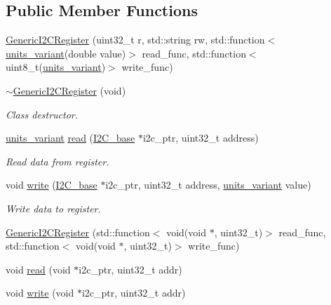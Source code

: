 \subsection*{Public Member Functions}
\begin{DoxyCompactItemize}
\item 
\hyperlink{class_generic_i2_c_register_acc3dd8df2df5532b2e30ba20c1ac8735}{Generic\+I2\+C\+Register} (uint32\+\_\+t r, std\+::string rw, std\+::function$<$ \hyperlink{units__define_8hpp_a95d46867fa79633565c288a0b4bd5408}{units\+\_\+variant}(double value)$>$ read\+\_\+func, std\+::function$<$ uint8\+\_\+t(\hyperlink{units__define_8hpp_a95d46867fa79633565c288a0b4bd5408}{units\+\_\+variant})$>$ write\+\_\+func)
\item 
\hyperlink{class_generic_i2_c_register_a17eb3844eb23aabe6fddfcef798e692f}{$\sim$\+Generic\+I2\+C\+Register} (void)
\begin{DoxyCompactList}\small\item\em Class destructor. \end{DoxyCompactList}\item 
\hyperlink{units__define_8hpp_a95d46867fa79633565c288a0b4bd5408}{units\+\_\+variant} \hyperlink{class_generic_i2_c_register_a86c28b9c5eecacca106132e7718b2646}{read} (\hyperlink{class_i2_c__base}{I2\+C\+\_\+base} $\ast$i2c\+\_\+ptr, uint32\+\_\+t address)
\begin{DoxyCompactList}\small\item\em Read data from register. \end{DoxyCompactList}\item 
void \hyperlink{class_generic_i2_c_register_ad6f38b7b54c95e3f8502de01f6122d60}{write} (\hyperlink{class_i2_c__base}{I2\+C\+\_\+base} $\ast$i2c\+\_\+ptr, uint32\+\_\+t address, \hyperlink{units__define_8hpp_a95d46867fa79633565c288a0b4bd5408}{units\+\_\+variant} value)
\begin{DoxyCompactList}\small\item\em Write data to register. \end{DoxyCompactList}\item 
\hyperlink{class_generic_i2_c_register_a20946c87287dd4b06f7f873dfeb0df9b}{Generic\+I2\+C\+Register} (std\+::function$<$ void(void $\ast$, uint32\+\_\+t)$>$ read\+\_\+func, std\+::function$<$ void(void $\ast$, uint32\+\_\+t)$>$ write\+\_\+func)
\item 
void \hyperlink{class_generic_i2_c_register_a61978f59fd6f303844bdba728b1f6866}{read} (void $\ast$i2c\+\_\+ptr, uint32\+\_\+t addr)
\item 
void \hyperlink{class_generic_i2_c_register_a77b68755fe06268a21402f1e3190bd95}{write} (void $\ast$i2c\+\_\+ptr, uint32\+\_\+t addr)
\end{DoxyCompactItemize}
